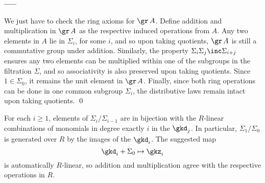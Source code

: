 \medskip
\centerline{\bf -----} \hfill
\medskip

 \enddemo
\demo{\it\Sol} We just have to check the ring axioms for $\gr\,A$.  Define addition and multiplication in $\gr\,A$ as the respective induced operations from $A$.  Any two elements in $A$ lie in $\Sigma_i$, for some $i$, and so upon taking quotients, $\gr\,A$ is still a commutative group under addition.  Similarly, the property $\Sigma_i\Sigma_j\inc\Sigma_{i+j}$ ensures any two elements can be multiplied within one of the subgroups in the filtration $\Sigma$, and so associativity is also preserved upon taking quotients.  Since $1\in\Sigma_0$, it remains the unit element in $\gr\,A$.  Finally, since both ring operations can be done in one common subgroup $\Sigma_i$, the distributive laws remain intact upon taking quotients. \qed

 \enddemo
\demo{\it\Sol} For each $i\geq 1$, elements of $\Sigma_i/\Sigma_{i-1}$ are in bijection with the $R$-linear combinations of monomials in degree exactly $i$ in the $\gkd_j$.  In particular, $\Sigma_1/\Sigma_0$ is generated over $R$ by the images of the $\gkd_i$.  The suggested map 
$$\gkd_i+\Sigma_0\mapsto\gkz_i$$
is automatically $R$-linear, so addition and multiplication agree with the respective operations in $R$. 

